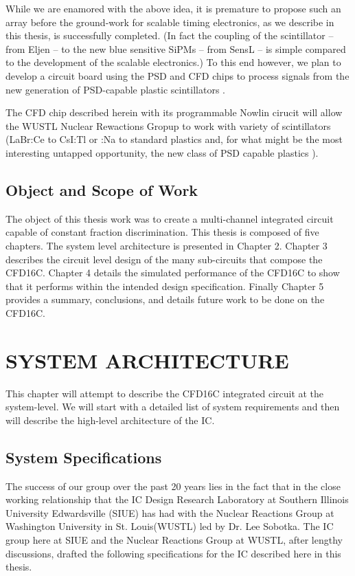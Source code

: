 \documentclass[12pt,oneside,final]{siuethesis}
\theoremstyle{definition}
\begin{document}
While we are enamored with the above idea, it is premature to propose such an array before the ground-work for scalable timing electronics, as we describe in this thesis, is successfully completed. (In fact the coupling of the scintillator – from Eljen – to the new blue sensitive SiPMs – from SensL – is simple compared to the development of the scalable electronics.) To this end however, we plan to develop a circuit board using the PSD and CFD chips to process signals from the new generation of PSD-capable plastic scintillators \cite{ZAITSEVA}. 

The CFD chip described herein with its programmable Nowlin cirucit will allow the WUSTL Nuclear Rewactions Gropup to work with variety of scintillators (LaBr:Ce to CsI:Tl or :Na to standard plastics and, for what might be the most interesting untapped opportunity, the new class of PSD capable plastics \cite{ZAITSEVA}).  


\section{Object and Scope of Work} 

\par The object of this thesis work was to create a multi-channel integrated circuit capable of constant fraction discrimination. This thesis is composed of five chapters. The system level architecture is presented in Chapter 2. Chapter 3 describes the circuit level design of the many sub-circuits that compose the CFD16C. Chapter 4 details the simulated performance of the CFD16C to show that it performs within the intended design specification. Finally Chapter 5 provides a summary, conclusions, and details future work to be done on the CFD16C.



\chapter{SYSTEM ARCHITECTURE}

This chapter will attempt to describe the CFD16C integrated circuit at the system-level.  We will start with a detailed list of system requirements and then will describe the high-level architecture of the IC.

\section{System Specifications}
The success of our group over the past 20 years lies in the fact that in the close working relationship that the IC Design Research Laboratory at Southern Illinois University Edwardsville (SIUE) has had with the Nuclear Reactions Group at Washington University in St. Louis(WUSTL) led by Dr. Lee Sobotka.  The IC group here at SIUE and the Nuclear Reactions Group at WUSTL, after lengthy discussions, drafted the following specifications for the IC described here in this thesis.
\end{document}
